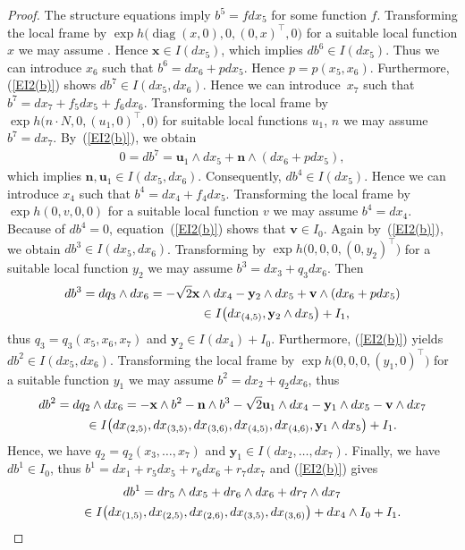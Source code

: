 \documentclass[pdftex]{sigma}
\numberwithin{equation}{section}
\newcommand\bx{{\mathbf x}}
\newcommand\bu{{\mathbf u}}
\newcommand\by{{\mathbf y}}
\newcommand\bn{{\mathbf n}}
\newcommand\bv{{\mathbf v}}
\newcommand{\diag}{\operatorname{diag}}
\begin{document}
\begin{proof} The structure equations imply $b^5=fdx_5$ for some function $f$. Transforming the local frame by $\exp h\big(\diag(x,0),0,(0,x)^\top,0\big)$ for a suitable local function $x$ we may assume . Hence $\bx\in I(dx_5)$, which implies $db^6\in I(dx_5)$. Thus we can introduce $x_6$ such that $b^6=dx_6 +p dx_5$. Hence $p=p(x_5,x_6)$. Furthermore, (\ref{EI2(b)}) shows $db^7\in I(dx_5, dx_6)$. Hence we can introduce~$x_7$ such that $b^7=dx_7+f_5 dx_5+f_6 dx_6$. Transforming the local frame by $\exp h\big(n\cdot N,0,(u_1,0)^\top,0\big)$ for suitable local functions $u_1$, $n$ we may assume $b^7=dx_7$. By~(\ref{EI2(b)}), we obtain
\begin{gather*}0=db^7=\bu_1\wedge dx_5 +\bn \wedge (dx_6+p dx_5),\end{gather*}
which implies $\bn, \bu_1\in I(dx_5,dx_6)$. Consequently, $db^4\in I(dx_5)$. Hence we can introduce $x_4$ such that $b^4=dx_4+f_4 dx_5$. Transforming the local frame by $\exp h(0,v,0,0)$ for a suitable local function $v$ we may assume $b^4=dx_4$. Because of $db^4=0$, equation~(\ref{EI2(b)}) shows that $\bv\in I_0$. Again by~(\ref{EI2(b)}), we obtain $db^3\in I(dx_5,dx_6)$. Transforming by $\exp h\big(0,0,0,(0,y_2)^\top\big)$ for a suitable local function $y_2$ we may assume $b^3=dx_3+q_3 dx_6$. Then
\begin{gather*}
db^3 = dq_3\wedge dx_6 = -\sqrt2 \bx\wedge dx_4-\by_2\wedge dx_5+\bv\wedge (dx_6+pdx_5)\\
\hphantom{db^3 = dq_3\wedge dx_6}{} \in I\big(dx_{(4,5)}, \by_2\wedge dx_5\big)+I_1,
\end{gather*}
thus $q_3=q_3(x_5,x_6,x_7)$ and $\by_2\in I(dx_4)+I_0$. Furthermore, (\ref{EI2(b)}) yields $db^2\in I(dx_5,dx_6)$. Transforming the local frame by $\exp h\big(0,0,0,(y_1,0)^\top\big)$ for a suitable function $y_1$ we may assume $b^2=dx_2+q_2 dx_6$, thus
\begin{gather*}
db^2 = dq_2\wedge dx_6 = -\bx\wedge b^2 -\bn \wedge b^3 -\sqrt2 \bu_1\wedge dx_4-\by_1\wedge dx_5-\bv\wedge dx_7\\
\hphantom{db^2}{} \in I\big(dx_{(2,5)}, dx_{(3,5)}, dx_{(3,6)}, dx_{(4,5)}, dx_{(4,6)}, \by_1\wedge dx_5\big)+I_1.
\end{gather*}
Hence, we have $q_2=q_2(x_3,\dots,x_7)$ and $\by_1\in I(dx_2,\dots,dx_7 )$. Finally, we have $db^1\in I_0$, thus $b^1=dx_1+r_5dx_5+r_6dx_6+r_7dx_7$ and (\ref{EI2(b)}) gives
\begin{gather*}
db^1 = dr_5\wedge dx_5+dr_6\wedge dx_6+dr_7\wedge dx_7\\
\hphantom{db^1}{} \in I\big( dx_{(1,5)}, dx_{(2,5)}, dx_{(2,6)}, dx_{(3,5)}, dx_{(3,6)} \big)+dx_4\wedge I_0 +I_1.
\end{gather*}


\end{proof}
\end{document}
